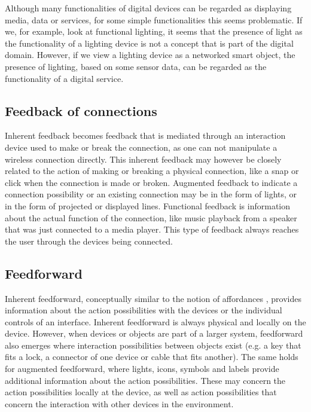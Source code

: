 Although many functionalities of digital devices can be regarded as displaying media, data or services, for some simple functionalities this seems problematic. If we, for example, look at functional lighting, it seems that the presence of light as the functionality of a lighting device is not a concept that is part of the digital domain. However, if we view a lighting device as a networked smart object, the presence of lighting, based on some sensor data, can be regarded as the functionality of a digital service.


\subsection{Feedback of connections}

Inherent feedback becomes feedback that is mediated through an interaction device used to make or break the connection, as one can not manipulate a wireless connection directly. This inherent feedback may however be closely related to the action of making or breaking a physical connection, like a snap or click when the connection is made or broken. Augmented feedback to indicate a connection possibility or an existing connection may be in the form of lights, or in the form of projected or displayed lines. Functional feedback is information about the actual function of the connection, like music playback from a speaker that was just connected to a media player. This type of feedback always reaches the user through the devices being connected. 

\subsection{Feedforward}
Inherent feedforward, conceptually similar to the notion of affordances  \cite{Norman1998}, provides information about the action possibilities with the devices or the individual controls of an interface. Inherent feedforward is always physical and locally on the device. However, when devices or objects are part of a larger system, feedforward also emerges where interaction possibilities between objects exist (e.g. a key that fits a lock, a connector of one device or cable that fits another). The same holds for augmented feedforward, where lights, icons, symbols and labels provide additional information about the action possibilities. These may concern the action possibilities locally at the device, as well as action possibilities that concern the interaction with other devices in the environment. 

